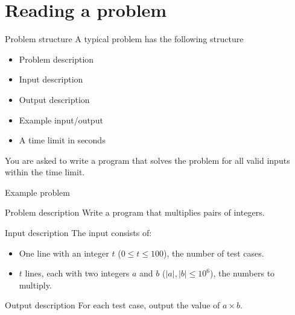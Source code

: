 \documentclass[11pt,pdf, aspectratio=169]{beamer}
\begin{document}
  \section{Reading a problem}
  \begin{frame}{Problem structure}
    A typical problem has the following structure
    \begin{itemize}
      \item Problem description
      \item Input description
      \item Output description
      \item Example input/output
      \item A time limit in seconds
    \end{itemize}
    You are asked to write a program that solves the problem for all valid inputs within the time limit.
  \end{frame}
  \begin{frame}{Example problem}
    \begin{block}{Problem description}
      Write a program that multiplies pairs of integers.
    \end{block}
    \vspace{10pt}
    \begin{block}{Input description}
      The input consists of:
      \begin{itemize}
        \item One line with an integer $t$ ($0\leq t\leq 100$), the number of test cases.
        \item $t$ lines, each with two integers $a$ and $b$ ($|a|,|b| \leq 10^6$), the numbers to multiply.
      \end{itemize}
    \end{block}

    \vspace{10pt}

    \begin{block}{Output description}
      For each test case, output the value of $a\times b$.
    \end{block}
  \end{frame}
\end{document}
